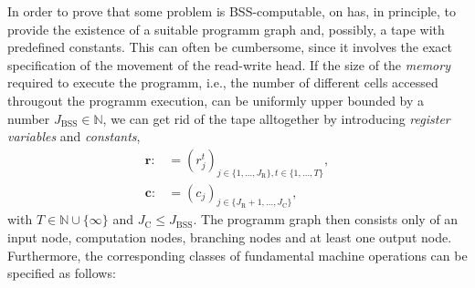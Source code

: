 \documentclass[conference]{IEEEtran}
\def\NN{{\mathbb N}}
\newcommand{\BSS}{\mathrm{BSS}}
\begin{document}
	In order to prove that some problem is BSS-computable, on has, in principle, to provide the existence of a suitable programm graph and, possibly, a tape with predefined constants. 
	This can often be cumbersome, since it involves the exact specification of the movement of the read-write head. If the size of the \emph{memory} required to execute the programm, i.e., 
	the number of different cells accessed througout the programm execution, can be uniformly upper bounded by a number \(J_\BSS \in \NN\), we can get rid of the tape alltogether by 
	introducing \emph{register variables} and \emph{constants},
	\begin{align*}	\bm{r} :&= (r_j^t)_{j\in\{1,\ldots,J_{\mathrm{R}}\}, t\in\{1,\ldots,T\}},\\
					\bm{c} :&= (c_j)_{j\in\{J_{\mathrm{R}} + 1,\ldots,J_{\mathrm{C}}\}},
	\end{align*}
	with \(T\in\NN\cup\{\infty\}\) and \(J_{\mathrm{C}} \leq J_\BSS\). The programm graph then consists only of an input node, computation nodes, branching nodes and at least one output node.
	Furthermore, the corresponding classes of fundamental machine operations can be specified as follows:
\end{document}
